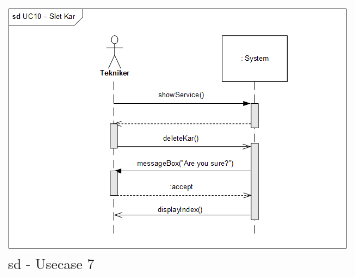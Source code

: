\begin{figure}[H]
    \centering
    \includegraphics[width=0.8\textwidth]{Systemarkitektur/OverordnedeSekvensdiagrammer/sd_UC10.png}
    \caption{sd - Usecase 7}
    \label{fig:sd_UC6}
\end{figure}